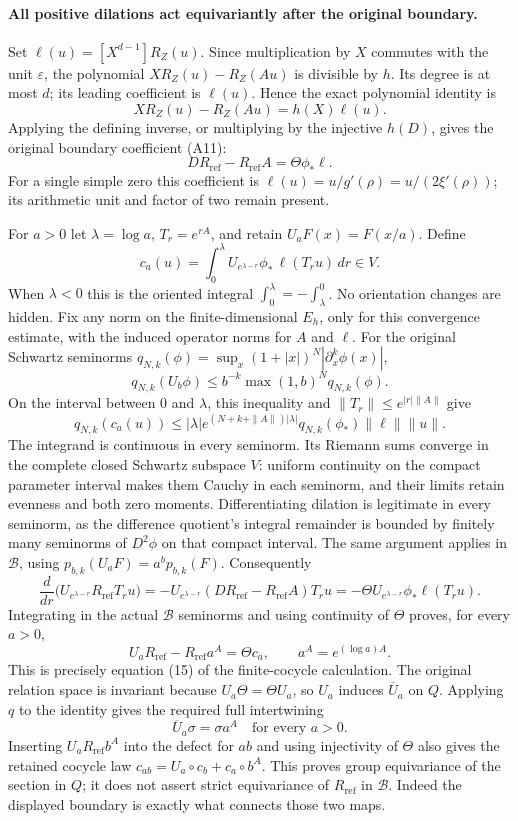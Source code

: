 \paragraph{All positive dilations act equivariantly after the original boundary.}
Set \(\ell(u)=[X^{d-1}]R_Z(u)\). Since multiplication by \(X\) commutes
with the unit \(\varepsilon\), the polynomial
\(XR_Z(u)-R_Z(Au)\) is divisible by \(h\). Its degree is at most \(d\);
its leading coefficient is \(\ell(u)\). Hence the exact polynomial
identity is
\[
 XR_Z(u)-R_Z(Au)=h(X)\ell(u).
\]
Applying the defining inverse, or multiplying by the injective
\(h(D)\), gives the original boundary coefficient (A11):
\[
 DR_{\mathrm{ref}}-R_{\mathrm{ref}}A=\Theta\phi_*\ell.
\]
For a single simple zero this coefficient is
\(\ell(u)=u/g'(\rho)=u/(2\xi'(\rho))\); its arithmetic unit and factor
of two remain present.

For \(a>0\) let \(\lambda=\log a\), \(T_r=e^{rA}\), and retain
\(U_aF(x)=F(x/a)\). Define
\[
 c_a(u)=\int_0^\lambda
 U_{e^{\lambda-r}}\phi_*\,\ell(T_ru)\,dr\in V.
\]
When \(\lambda<0\) this is the oriented integral
\(\int_0^\lambda=-\int_\lambda^0\). No orientation changes are hidden.
Fix any norm on the finite-dimensional \(E_h\), only for this convergence
estimate, with the induced operator norms for \(A\) and \(\ell\).
For the original Schwartz seminorms
\(q_{N,k}(\phi)=\sup_x(1+|x|)^N|\partial_x^k\phi(x)|\),
\[
 q_{N,k}(U_b\phi)\leq b^{-k}\max(1,b)^Nq_{N,k}(\phi).
\]
On the interval between 0 and \(\lambda\), this inequality and
\(\|T_r\|\leq e^{|r|\|A\|}\) give
\[
 q_{N,k}(c_a(u))\leq
 |\lambda|e^{(N+k+\|A\|)|\lambda|}
 q_{N,k}(\phi_*)\|\ell\|\|u\|.
\]
The integrand is continuous in every seminorm. Its Riemann sums converge
in the complete closed Schwartz subspace \(V\): uniform continuity on
the compact parameter interval makes them Cauchy in each seminorm,
and their limits retain evenness and both zero moments. Differentiating
dilation is legitimate in every seminorm, as the difference quotient's
integral remainder is bounded by finitely many seminorms of
\(D^2\phi\) on that compact interval. The same argument applies in
\(\mathscr B\), using \(p_{b,k}(U_aF)=a^bp_{b,k}(F)\).
Consequently
\[
 \frac{d}{dr}\bigl(U_{e^{\lambda-r}}R_{\mathrm{ref}}T_ru\bigr)
 =-U_{e^{\lambda-r}}
   (DR_{\mathrm{ref}}-R_{\mathrm{ref}}A)T_ru
 =-\Theta U_{e^{\lambda-r}}\phi_*\ell(T_ru).
\]
Integrating in the actual \(\mathscr B\) seminorms and using continuity
of \(\Theta\) proves, for every \(a>0\),
\[
 U_aR_{\mathrm{ref}}-R_{\mathrm{ref}}a^A=\Theta c_a,
 \qquad a^A=e^{(\log a)A}.
\]
This is precisely equation (15) of the finite-cocycle calculation.
The original relation space is invariant because
\(U_a\Theta=\Theta U_a\), so \(U_a\) induces \(\overline U_a\) on \(Q\).
Applying \(q\) to the identity gives the required full intertwining
\[
 \boxed{\overline U_a\sigma=\sigma a^A\quad\text{for every }a>0.}
\]
Inserting \(U_aR_{\mathrm{ref}}b^A\) into the defect for \(ab\)
and using injectivity of \(\Theta\) also gives the retained cocycle law
\(c_{ab}=U_a\circ c_b+c_a\circ b^A\).
This proves group equivariance of the section in \(Q\); it does not
assert strict equivariance of \(R_{\mathrm{ref}}\) in \(\mathscr B\).
Indeed the displayed boundary is exactly what connects those two maps.

